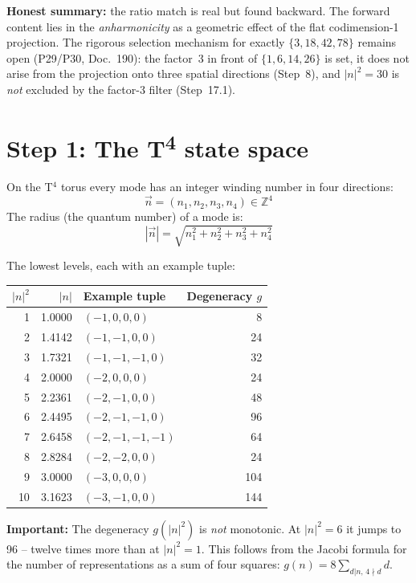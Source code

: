 \textbf{Honest summary:} the ratio match is real but found backward. The
forward content lies in the \emph{anharmonicity} as a geometric effect of the
flat codimension-1 projection. The rigorous selection mechanism for exactly
$\{3,18,42,78\}$ remains open (P29/P30, Doc.~190): the factor~3 in front of
$\{1,6,14,26\}$ is set, it does not arise from the projection onto three spatial
directions (Step~8), and $|n|^2=30$ is \emph{not} excluded by the factor-3
filter (Step~17.1).

\section{Step 1: The T\textsuperscript{4} state space}

On the T$^4$ torus every mode has an integer winding number in
four directions:
\[
  \vec{n} = (n_1, n_2, n_3, n_4) \in \mathbb{Z}^4
\]
The radius (the quantum number) of a mode is:
\[
  |\vec{n}| = \sqrt{n_1^2 + n_2^2 + n_3^2 + n_4^2}
\]

The lowest levels, each with an example tuple:

\begin{center}
\begin{tabular}{rrlr}
\toprule
$|n|^2$ & $|n|$ & Example tuple & Degeneracy $g$ \\
\midrule
1 & 1{.}0000 & $(-1,0,0,0)$ & 8 \\
2 & 1{.}4142 & $(-1,-1,0,0)$ & 24 \\
3 & 1{.}7321 & $(-1,-1,-1,0)$ & 32 \\
4 & 2{.}0000 & $(-2,0,0,0)$ & 24 \\
5 & 2{.}2361 & $(-2,-1,0,0)$ & 48 \\
6 & 2{.}4495 & $(-2,-1,-1,0)$ & 96 \\
7 & 2{.}6458 & $(-2,-1,-1,-1)$ & 64 \\
8 & 2{.}8284 & $(-2,-2,0,0)$ & 24 \\
9 & 3{.}0000 & $(-3,0,0,0)$ & 104 \\
10 & 3{.}1623 & $(-3,-1,0,0)$ & 144 \\
\bottomrule
\end{tabular}
\end{center}

\textbf{Important:} The degeneracy $g(|n|^2)$ is \emph{not} monotonic.
At $|n|^2 = 6$ it jumps to 96 -- twelve times more than at $|n|^2 = 1$.
This follows from the Jacobi formula for the number of representations as
a sum of four squares: $g(n) = 8 \sum_{d | n,\, 4\nmid d} d$.


